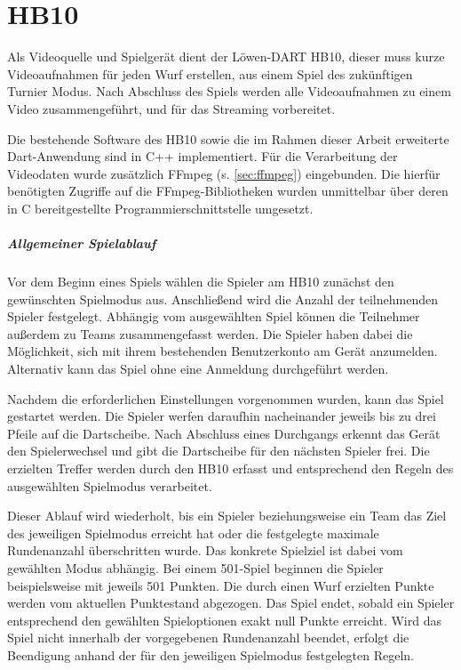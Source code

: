 \chapter{HB10} \label{sec:dart}

Als Videoquelle und Spielgerät dient der Löwen-DART HB10, dieser muss kurze Videoaufnahmen für jeden Wurf erstellen, aus einem Spiel des zukünftigen Turnier Modus. Nach Abschluss des Spiels werden alle Videoaufnahmen zu einem Video zusammengeführt, und für das Streaming vorbereitet.

Die bestehende Software des HB10 sowie die im Rahmen dieser Arbeit erweiterte Dart-Anwendung sind in C++ implementiert. Für die Verarbeitung der Videodaten wurde zusätzlich FFmpeg (s. \cref{sec:ffmpeg}) eingebunden. 
Die hierfür benötigten Zugriffe auf die FFmpeg-Bibliotheken wurden unmittelbar über deren in C bereitgestellte Programmierschnittstelle umgesetzt.

\paragraph{Allgemeiner Spielablauf} 

Vor dem Beginn eines Spiels wählen die Spieler am HB10 zunächst den gewünschten Spielmodus aus. Anschließend wird die Anzahl der teilnehmenden Spieler festgelegt. Abhängig vom ausgewählten Spiel können die Teilnehmer außerdem zu Teams zusammengefasst werden. Die Spieler haben dabei die Möglichkeit, 
sich mit ihrem bestehenden Benutzerkonto am Gerät anzumelden. Alternativ kann das Spiel ohne eine Anmeldung durchgeführt werden. 

Nachdem die erforderlichen Einstellungen vorgenommen wurden, kann das Spiel gestartet werden. Die Spieler werfen daraufhin nacheinander jeweils bis zu drei Pfeile auf die Dartscheibe. Nach Abschluss eines Durchgangs erkennt das Gerät den Spielerwechsel und gibt die Dartscheibe für den nächsten Spieler frei. 
Die erzielten Treffer werden durch den HB10 erfasst und entsprechend den Regeln des ausgewählten Spielmodus verarbeitet. 

Dieser Ablauf wird wiederholt, bis ein Spieler beziehungsweise ein Team das Ziel des jeweiligen Spielmodus erreicht hat oder die festgelegte maximale Rundenanzahl überschritten wurde. Das konkrete Spielziel ist dabei vom gewählten Modus abhängig. Bei einem 501-Spiel beginnen die Spieler beispielsweise mit jeweils 501 Punkten. 
Die durch einen Wurf erzielten Punkte werden vom aktuellen Punktestand abgezogen. Das Spiel endet, sobald ein Spieler entsprechend den gewählten Spieloptionen exakt null Punkte erreicht. Wird das Spiel nicht innerhalb der vorgegebenen Rundenanzahl beendet, 
erfolgt die Beendigung anhand der für den jeweiligen Spielmodus festgelegten Regeln.

